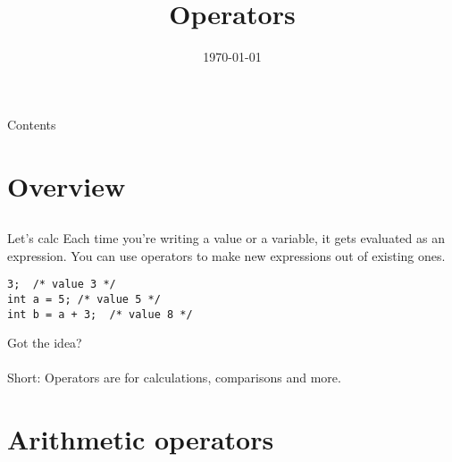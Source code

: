 
\newcommand{\topic}{
	Operators
}

\title{\topic}
\supertitle{\course}
\date{\today}



\maketitle

\begin{frame}{Contents}
	\tableofcontents
\end{frame}

\section{Overview}
\subsection{}
\begin{frame}[fragile]{Let's calc}
	Each time you're writing a value or a variable, it gets evaluated as an expression. You can use operators to make new expressions out of existing ones.
	\begin{lstlisting}[numbers=none]
3;	/* value 3 */
int a = 5; /* value 5 */
int b = a + 3;	/* value 8 */
\end{lstlisting}
Got the idea?\\
\ \\Short: Operators are for calculations, comparisons and more.
\end{frame}
\section{Arithmetic operators}
